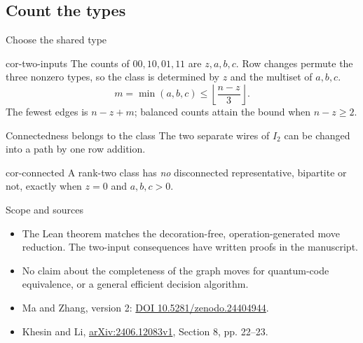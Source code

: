 \documentclass{beamer}
\begin{document}
\subsection{Count the types}
\begin{frame}{Choose the shared type}
  \begin{bookresult}{cor-two-inputs}
    The counts of $00,10,01,11$ are $z,a,b,c$. Row changes permute the three nonzero types, so the class is determined by $z$ and the multiset of $a,b,c$.
    \[ m=\min(a,b,c)\leq\left\lfloor\frac{n-z}{3}\right\rfloor. \]
    The fewest edges is $n-z+m$; balanced counts attain the bound when $n-z\geq2$.
  \end{bookresult}
\end{frame}
\begin{frame}{Connectedness belongs to the class}
  The two separate wires of $I_2$ can be changed into a path by one row addition.
  \begin{bookresult}{cor-connected}
    A rank-two class has \emph{no} disconnected representative, bipartite or not, exactly when $z=0$ and $a,b,c>0$.
  \end{bookresult}
\end{frame}
\begin{frame}{Scope and sources}
  \begin{itemize}
    \item The Lean theorem matches the decoration-free, operation-generated move reduction. The two-input consequences have written proofs in the manuscript.
    \item No claim about the completeness of the graph moves for quantum-code equivalence, or a general efficient decision algorithm.
    \item Ma and Zhang, version 2: \href{https://doi.org/10.5281/zenodo.24404944}{DOI 10.5281/zenodo.24404944}.
    \item Khesin and Li, \href{https://arxiv.org/abs/2406.12083v1}{arXiv:2406.12083v1}, Section 8, pp. 22--23.
  \end{itemize}
\end{frame}
\appendix
\FormalVerification
\end{document}
